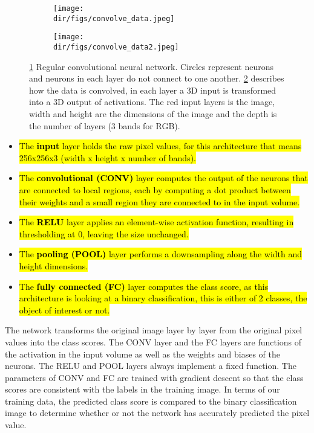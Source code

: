 \begin{figure}[H]
\centering
\begin{subfigure}{0.45\textwidth}
\texttt{[image: \\dir/figs/convolve\_data.jpeg]}
\caption{}
\label{fig.convolve_data1}
\end{subfigure}%
\qquad
\begin{subfigure}{0.45\textwidth}
\texttt{[image: \\dir/figs/convolve\_data2.jpeg]}
\caption{}
\label{fig.convolve_data2}
\end{subfigure}
\caption[Basic Convolutional Neural Network architecture]{\ref{fig.convolve_data1} Regular convolutional neural network. Circles represent neurons and neurons in each layer do not connect to one another. \ref{fig.convolve_data2} describes how the data is convolved, in each layer a 3D input is transformed into a 3D output of activations. The red input layers is the image, width and height are the dimensions of the image and the depth is the number of layers (3 bands for RGB).}
\label{fig.convolve_data}
\end{figure}

\begin{itemize}
    
    \item \hl{The \textbf{input} layer holds the raw pixel values, for this architecture that means 256x256x3 (width x height x number of bands).}
    \item \hl{The \textbf{convolutional (CONV)} layer computes the output of the neurons that are connected to local regions, each by computing a dot product between their weights and a small region they are connected to in the input volume.}
    \item \hl{The \textbf{RELU} layer applies an element-wise activation function, resulting in thresholding at 0, leaving the size unchanged.}
    \item \hl{The \textbf{pooling (POOL)} layer performs a downsampling along the width and height dimensions.}
    \item \hl{The \textbf{fully connected (FC)} layer computes the class score, as this architecture is looking at a binary classification, this is either of 2 classes, the object of interest or not.} 
\end{itemize}
\par
The network transforms the original image layer by layer from the original pixel values into the class scores. The CONV layer and the FC layers are functions of the activation in the input volume as well as the weights and biases of the neurons. The RELU and POOL layers always implement a fixed function. The parameters of CONV and FC are trained with gradient descent so that the class scores are consistent with the labels in the training image. In terms of our training data, the predicted class score is compared to the binary classification image to determine whether or not the network has accurately predicted the pixel value.
\par
